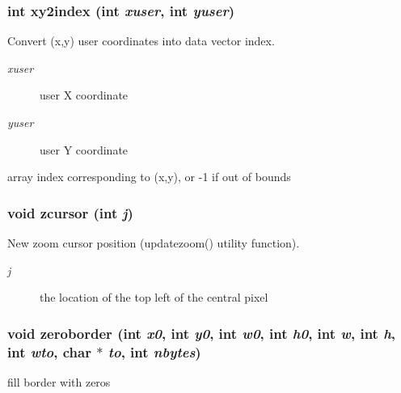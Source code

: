 \subsubsection{\setlength{\rightskip}{0pt plus 5cm}int xy2index (int {\em xuser}, int {\em yuser})}\label{xtvutils_8c_a231}


Convert (x,y) user coordinates into data vector index. 

\begin{Desc}
\item[Parameters:]
\begin{description}
\item[{\em xuser}]user X coordinate \item[{\em yuser}]user Y coordinate \end{description}
\end{Desc}
\begin{Desc}
\item[Returns:]array index corresponding to (x,y), or -1 if out of bounds \end{Desc}
\subsubsection{\setlength{\rightskip}{0pt plus 5cm}void zcursor (int {\em j})}\label{xtvutils_8c_a206}


New zoom cursor position (updatezoom() utility function). 

\begin{Desc}
\item[Parameters:]
\begin{description}
\item[{\em j}]the location of the top left of the central pixel \end{description}
\end{Desc}
\subsubsection{\setlength{\rightskip}{0pt plus 5cm}void zeroborder (int {\em x0}, int {\em y0}, int {\em w0}, int {\em h0}, int {\em w}, int {\em h}, int {\em wto}, char $\ast$ {\em to}, int {\em nbytes})}\label{xtvutils_8c_a228}


fill border with zeros 

